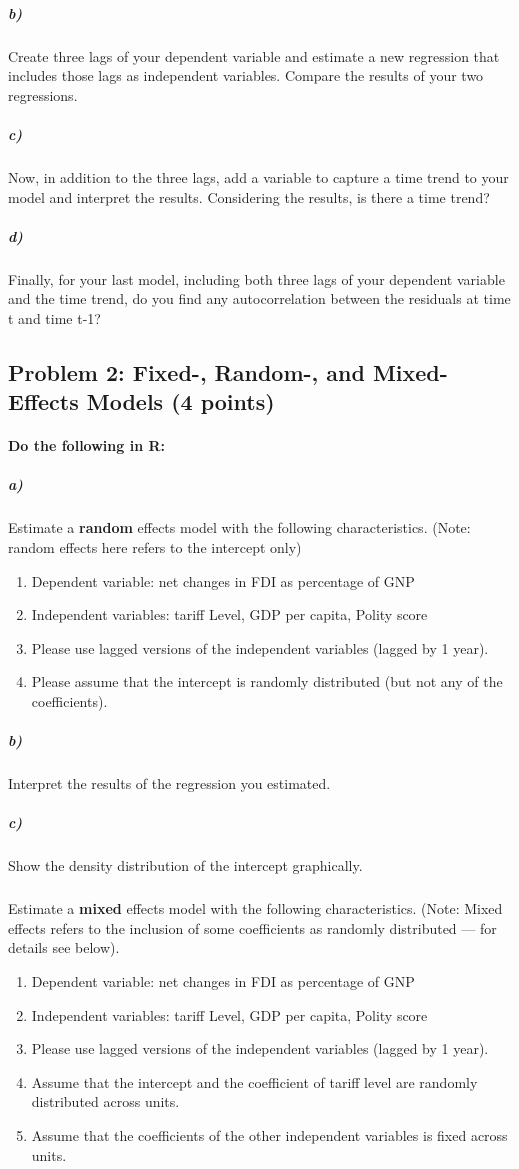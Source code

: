 \documentclass[12pt]{article}
\begin{document}
\subparagraph{b)} Create three lags of your dependent variable and estimate a new regression that includes those lags as independent variables. Compare the results of your two regressions.

\subparagraph{c)} Now, in addition to the three lags, add a variable to capture a time trend to your model and interpret the results. Considering the results, is there a time trend?

\subparagraph{d)} Finally, for your last model, including both three lags of your dependent variable and the time trend, do you find any autocorrelation between the residuals at time t and time t-1?



\subsection*{Problem 2: Fixed-, Random-, and Mixed-Effects Models (4 points)}

\paragraph{Do the following in R:}

\subparagraph{a)} Estimate a \textbf{random}  effects model with the following characteristics. (Note: random effects here refers to the intercept only)

\begin{enumerate}
	\item Dependent variable: net changes in FDI as percentage of GNP
	\item Independent variables: tariff Level, GDP per capita, Polity score
	\item Please use lagged versions of the independent variables (lagged by 1 year).
	\item Please assume that the intercept is randomly distributed (but not any of the coefficients).
\end{enumerate}

\subparagraph{b)} Interpret the results of the regression you estimated.

\subparagraph{c)} Show the density distribution of the intercept graphically.

\subparagraph{} Estimate a \textbf{mixed} effects model with the following characteristics. (Note: Mixed effects refers to the inclusion of some coefficients as randomly distributed --- for details see below).

\begin{enumerate}
	\item Dependent variable: net changes in FDI as percentage of GNP
	\item Independent variables: tariff Level, GDP per capita, Polity score
	\item Please use lagged versions of the independent variables (lagged by 1 year).
	\item Assume that the intercept and the coefficient of tariff level are randomly distributed across units.
	\item Assume that the coefficients of the other independent variables is fixed across units.
\end{enumerate}
\end{document}
